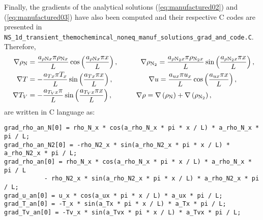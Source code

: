 \documentclass[10pt]{article}
\begin{document}
Finally, the gradients of the analytical solutions (\ref{eq:manufactured02}) and (\ref{eq:manufactured03}) have also been computed
and their respective C codes are presented in 
\texttt{NS\_1d\_transient\_themochemincal\_noneq\_manuf\_solutions\_grad\_and\_code.C}. Therefore,
\begin{equation}
\begin{split}
\nabla \rho_{\text{N}} &=  \dfrac{ a_{ \rho \text{N} x} \pi \rho_{\text{N}x} }{L} \cos\left( \dfrac{ a_{\rho \text{N} x} \pi x }{L}\right),
\quad\quad\quad\,
\nabla \rho_{\text{N}_2} =  \dfrac{ a_{ \rho \text{N}_2 x} \pi \rho_{\text{N}_2 x} }{L} \sin\left( \dfrac{ a_{ \rho \text{N}_2 x} \pi x }{L}\right),\vspace{10pt}\\
\quad
%
\nabla T &=- \dfrac{ a_{Tx} \pi T_x }{L} \sin\left( \dfrac{ a_{Tx} \pi x }{L}\right),
\quad\qquad\qquad
%
\nabla u = \dfrac{ a_{ux} \pi u_x}{L} \cos\left( \dfrac{ a_{ux} \pi x }{L}\right),
\vspace{10pt}\\
%
\nabla T_V &= - \dfrac{ a_{T_V x} \pi  }{L} \sin\left( \dfrac{ a_{T_Vx} \pi x }{L}\right),
\quad\quad\quad\,\,
%
\nabla \rho =\nabla \left( \rho_\text{N}\right) + \nabla \left(\rho_{\text{N}_2} \right),
\end{split}
\end{equation}
 are written in C language as:




\begin{small}
	

\begin{verbatim}
grad_rho_an_N[0] = rho_N_x * cos(a_rho_N_x * pi * x / L) * a_rho_N_x * pi / L;
grad_rho_an_N2[0] = -rho_N2_x * sin(a_rho_N2_x * pi * x / L) * a_rho_N2_x * pi / L;
grad_rho_an[0] = rho_N_x * cos(a_rho_N_x * pi * x / L) * a_rho_N_x * pi / L 
	       - rho_N2_x * sin(a_rho_N2_x * pi * x / L) * a_rho_N2_x * pi / L;
grad_u_an[0] = u_x * cos(a_ux * pi * x / L) * a_ux * pi / L;
grad_T_an[0] = -T_x * sin(a_Tx * pi * x / L) * a_Tx * pi / L;
grad_Tv_an[0] = -Tv_x * sin(a_Tvx * pi * x / L) * a_Tvx * pi / L;
\end{verbatim}


\end{small}

%
 



\appendix


\end{document}

